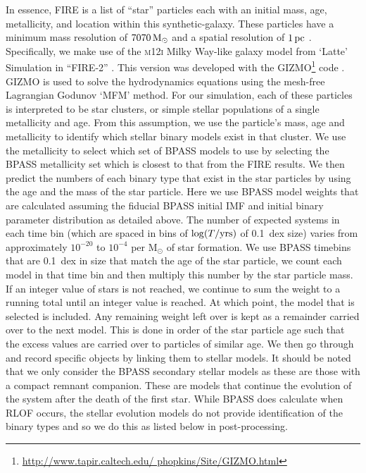 \documentclass{pas}
\begin{document}
In essence, \textsc{FIRE} is a list of ``star'' particles each with an initial mass, age, metallicity, and location within this synthetic-galaxy. These particles have a minimum mass resolution of $7070\,\rm{M}_\odot$ and a spatial resolution of $1\,\rm{pc}$ \citep{Sanderson_2020}. Specifically, we make use of the \textsc{m12i} Milky Way-like galaxy model from `Latte' Simulation \citep{2023ApJS..265...44W} in ``FIRE-2'' \citep{2018MNRAS.480..800H}. This version was developed with the GIZMO\footnote{\url{http://www.tapir.caltech.edu/ phopkins/Site/GIZMO.html}} code \citep{2015MNRAS.450...53H}. GIZMO is used to solve the hydrodynamics equations using the mesh-free Lagrangian Godunov `MFM' method. For our simulation, each of these particles is interpreted to be star clusters, or simple stellar populations of a single metallicity and age. From this assumption, we use the particle's mass, age and metallicity to identify which stellar binary models exist in that cluster. We use the metallicity to select which set of \textsc{BPASS} models to use by selecting the \textsc{BPASS} metallicity set which is closest to that from the \textsc{FIRE} results. We then predict the numbers of each binary type that exist in the star particles by using the age and the mass of the star particle. Here we use \textsc{BPASS} model weights that are calculated assuming the fiducial \textsc{BPASS} initial IMF and initial binary parameter distribution as detailed above. The number of expected systems in each time bin (which are spaced in bins of $\log(T/{\rm yrs})$ of 0.1~dex size) varies from approximately $10^{-20}$ to $10^{-4}$ per M$_{\odot}$ of star formation. We use \textsc{BPASS} timebins that are 0.1~dex in size that match the age of the star particle, we count each model in that time bin and then multiply this number by the star particle mass. If an integer value of stars is not reached, we continue to sum the weight to a running total until an integer value is reached. At which point, the model that is selected is included. Any remaining weight left over is kept as a remainder carried over to the next model. This is done in order of the star particle age such that the excess values are carried over to particles of similar age. We then go through and record specific objects by linking them to stellar models. It should be noted that we only consider the \textsc{BPASS} secondary stellar models as these are those with a compact remnant companion. These are models that continue the evolution of the system after the death of the first star. While \textsc{BPASS} does calculate when RLOF occurs, the stellar evolution models do not provide identification of the binary types and so we do this as listed below in post-processing.
\end{document}

